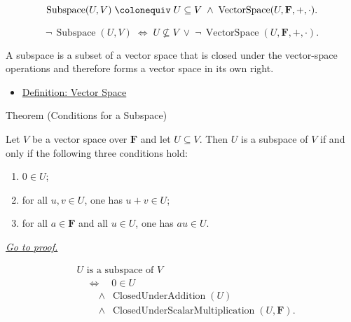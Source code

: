 \begin{remark*}
\[
\operatorname{Subspace}(U,V)
\;\colonequiv\;
U \subseteq V \;\wedge\; \operatorname{VectorSpace}(U,\mathbf{F},+,\cdot).
\]
\end{remark*}

\begin{remark*}
\[
\neg\,\operatorname{Subspace}(U,V)
\;\Longleftrightarrow\;
U \not\subseteq V
\;\vee\;
\neg\,\operatorname{VectorSpace}(U,\mathbf{F},+,\cdot).
\]
\end{remark*}

\begin{remark*}[Interpretation]
A subspace is a subset of a vector space that is closed under the vector-space
operations and therefore forms a vector space in its own right.
\end{remark*}

\begin{dependencies}
\begin{itemize}
  \item \hyperref[def:vector-space]{Definition: Vector Space}
\end{itemize}
\end{dependencies}


\begin{theorembox}{Theorem (Conditions for a Subspace)}
\begin{theorem}
\label{thm:conditions-for-a-subspace}
Let $V$ be a vector space over $\mathbf{F}$ and let $U \subseteq V$.
Then $U$ is a subspace of $V$ if and only if the following three conditions hold:
\begin{enumerate}[label=(\roman*)]
  \item $0 \in U$;
  \item for all $u,v \in U$, one has $u+v \in U$;
  \item for all $a \in \mathbf{F}$ and all $u \in U$, one has $au \in U$.
\end{enumerate}
\hyperref[prf:conditions-for-a-subspace]{\textit{Go to proof.}}
\end{theorem}
\end{theorembox}

\begin{remark*}
\[
\begin{aligned}
&U \text{ is a subspace of } V \\
&\quad\Longleftrightarrow\quad
0 \in U \\
&\qquad\land\;
\operatorname{ClosedUnderAddition}(U) \\
&\qquad\land\;
\operatorname{ClosedUnderScalarMultiplication}(U,\mathbf{F}).
\end{aligned}
\]
\end{remark*}

